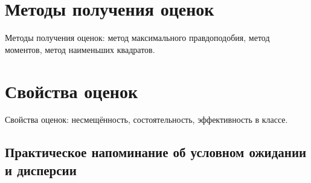 \documentclass[12pt]{article}
\begin{document}

\tableofcontents{}



\section{Методы получения оценок}

Методы получения оценок: метод максимального правдоподобия, метод моментов, метод наименьших квадратов.


\section{Свойства оценок}
Свойства оценок: несмещённость, состоятельность, эффективность в классе.

\subsection{Практическое напоминание об условном ожидании и дисперсии}
\end{document}
